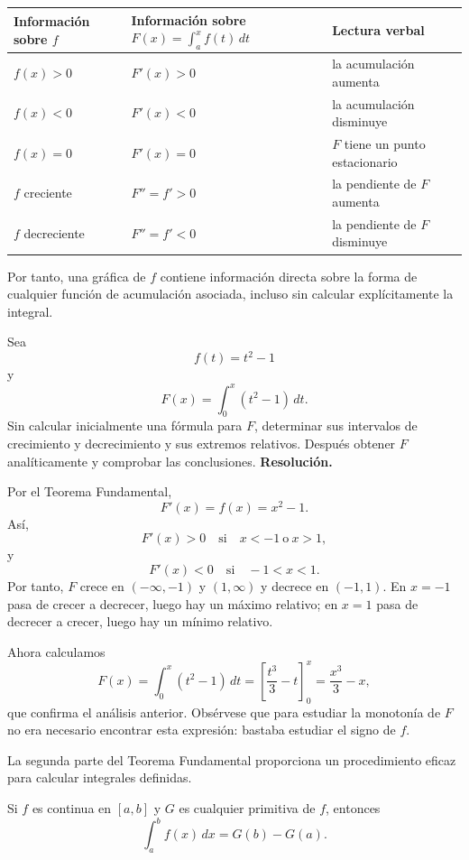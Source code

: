 \begin{center}
\begin{tabular}{p{}p{}p{}}
\toprule
Información sobre $f$ & Información sobre $F(x)=\int_a^x f(t)\,dt$ & Lectura verbal \\
\midrule
$f(x)>0$ & $F'(x)>0$ & la acumulación aumenta \\
$f(x)<0$ & $F'(x)<0$ & la acumulación disminuye \\
$f(x)=0$ & $F'(x)=0$ & $F$ tiene un punto estacionario \\
$f$ creciente & $F''=f'>0$ & la pendiente de $F$ aumenta \\
$f$ decreciente & $F''=f'<0$ & la pendiente de $F$ disminuye \\
\bottomrule
\end{tabular}
\end{center}

Por tanto, una gráfica de $f$ contiene información directa sobre la forma de cualquier función de acumulación asociada, incluso sin calcular explícitamente la integral.

\begin{solvedexercise}
Sea
\[
f(t)=t^2-1
\]
y
\[
F(x)=\int_0^x(t^2-1)\,dt.
\]
Sin calcular inicialmente una fórmula para $F$, determinar sus intervalos de crecimiento y decrecimiento y sus extremos relativos. Después obtener $F$ analíticamente y comprobar las conclusiones.
\tcblower
\textbf{Resolución.}\par\smallskip
Por el Teorema Fundamental,
\[
F'(x)=f(x)=x^2-1.
\]
Así,
\[
F'(x)>0\quad\text{si}\quad x<-1\ \text{o}\ x>1,
\]
y
\[
F'(x)<0\quad\text{si}\quad -1<x<1.
\]
Por tanto, $F$ crece en $(-\infty,-1)$ y $(1,\infty)$ y decrece en $(-1,1)$. En $x=-1$ pasa de crecer a decrecer, luego hay un máximo relativo; en $x=1$ pasa de decrecer a crecer, luego hay un mínimo relativo.

Ahora calculamos
\[
F(x)=\int_0^x(t^2-1)\,dt
=
\left[\frac{t^3}{3}-t\right]_0^x
=
\frac{x^3}{3}-x,
\]
que confirma el análisis anterior. Obsérvese que para estudiar la monotonía de $F$ no era necesario encontrar esta expresión: bastaba estudiar el signo de $f$.
\end{solvedexercise}

La segunda parte del Teorema Fundamental proporciona un procedimiento eficaz para calcular integrales definidas.

\begin{theorem}
Si $f$ es continua en $[a,b]$ y $G$ es cualquier primitiva de $f$, entonces
\[
\boxed{\int_a^b f(x)\,dx=G(b)-G(a).}
\]
\end{theorem}

